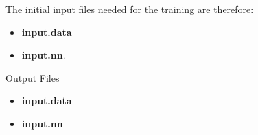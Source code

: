 \documentclass[12pt]{article}
\begin{document}




The initial input files needed for the training are therefore:
\begin{itemize}
    \item \textbf{input.data}
    \item \textbf{input.nn}.
\end{itemize}

\begin{mybox3}{Output Files}
\begin{itemize}
    \item \textbf{input.data}
    \item \textbf{input.nn} 
\end{itemize}
\end{mybox3}
%
\end{document}
